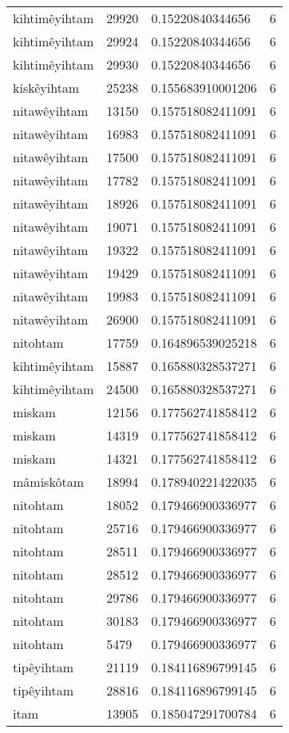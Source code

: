 \begin{longtable}{llll}
kihtimêyihtam & 29920 & 0.15220840344656 & 6 \\
kihtimêyihtam & 29924 & 0.15220840344656 & 6 \\
kihtimêyihtam & 29930 & 0.15220840344656 & 6 \\
kiskêyihtam & 25238 & 0.155683910001206 & 6 \\
nitawêyihtam & 13150 & 0.157518082411091 & 6 \\
nitawêyihtam & 16983 & 0.157518082411091 & 6 \\
nitawêyihtam & 17500 & 0.157518082411091 & 6 \\
nitawêyihtam & 17782 & 0.157518082411091 & 6 \\
nitawêyihtam & 18926 & 0.157518082411091 & 6 \\
nitawêyihtam & 19071 & 0.157518082411091 & 6 \\
nitawêyihtam & 19322 & 0.157518082411091 & 6 \\
nitawêyihtam & 19429 & 0.157518082411091 & 6 \\
nitawêyihtam & 19983 & 0.157518082411091 & 6 \\
nitawêyihtam & 26900 & 0.157518082411091 & 6 \\
nitohtam & 17759 & 0.164896539025218 & 6 \\
kihtimêyihtam & 15887 & 0.165880328537271 & 6 \\
kihtimêyihtam & 24500 & 0.165880328537271 & 6 \\
miskam & 12156 & 0.177562741858412 & 6 \\
miskam & 14319 & 0.177562741858412 & 6 \\
miskam & 14321 & 0.177562741858412 & 6 \\
mâmiskôtam & 18994 & 0.178940221422035 & 6 \\
nitohtam & 18052 & 0.179466900336977 & 6 \\
nitohtam & 25716 & 0.179466900336977 & 6 \\
nitohtam & 28511 & 0.179466900336977 & 6 \\
nitohtam & 28512 & 0.179466900336977 & 6 \\
nitohtam & 29786 & 0.179466900336977 & 6 \\
nitohtam & 30183 & 0.179466900336977 & 6 \\
nitohtam & 5479 & 0.179466900336977 & 6 \\
tipêyihtam & 21119 & 0.184116896799145 & 6 \\
tipêyihtam & 28816 & 0.184116896799145 & 6 \\
itam & 13905 & 0.185047291700784 & 6 \\

\end{longtable}
